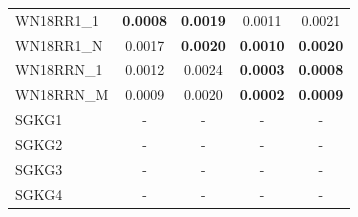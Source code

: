 \begin{table}[t]
{\begin{tabular}{l||cc||cc}
WN18RR1\_1 & \textbf{0.0008} & \textbf{0.0019} & 0.0011 & 0.0021 \\
WN18RR1\_N & 0.0017 & \textbf{0.0020} & \textbf{0.0010} & \textbf{0.0020} \\
WN18RRN\_1 & 0.0012 & 0.0024 & \textbf{0.0003} & \textbf{0.0008} \\
WN18RRN\_M & 0.0009 & 0.0020 & \textbf{0.0002} & \textbf{0.0009} \\
\hline
SGKG1 & - & - & - & - \\
SGKG2 & - & - & - & - \\
SGKG3 & - & - & - & - \\
SGKG4 & - & - & - & - \\
\hline
\end{tabular}%
}
\end{table}
